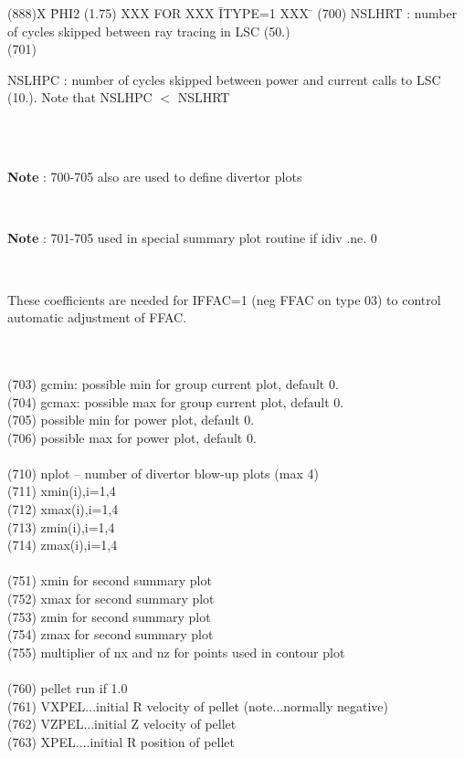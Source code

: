 \begin{tabbing}
(888)X \= PHI2 (1.75) XXX FOR XXX \= ITYPE=1 XXX \= \kill
(700) \> NSLHRT : number of cycles skipped between ray tracing in LSC (50.)\\
(701) \> \parbox[t]{\width}{NSLHPC : number of cycles skipped between power and current calls to LSC
(10.). Note that NSLHPC $<$ NSLHRT}\\
 \\
\parbox[t]{\textwidth}{{\bf Note} : 700-705 also are used to define divertor plots} \\
\parbox[t]{\textwidth}{{\bf Note} : 701-705 used in special summary plot routine if idiv .ne. 0} \\
\parbox[t]{\textwidth}{These coefficients are needed for IFFAC=1 (neg FFAC on type 03) to
control automatic adjustment of FFAC.}\\
  \\  
(703) \> gcmin: possible min for group current plot, default 0. \\
(704) \> gcmax: possible max for group current plot, default 0. \\
(705) \> possible min for power plot, default 0. \\
(706) \> possible max for power plot, default 0. \\
  \\  
(710) \> nplot -- number of divertor blow-up plots (max 4) \\
(711) \> xmin(i),i=1,4 \\
(712) \> xmax(i),i=1,4 \\
(713) \> zmin(i),i=1,4 \\
(714) \> zmax(i),i=1,4 \\
  \\  
(751) \> xmin for second summary plot \\
(752) \> xmax for second summary plot \\
(753) \> zmin for second summary plot \\
(754) \> zmax for second summary plot \\
(755) \> multiplier of nx and nz for points used in contour plot \\
  \\  
(760) \> pellet run if 1.0 \\
(761) \> VXPEL...initial R velocity of pellet (note...normally negative) \\
(762) \> VZPEL...initial Z velocity of pellet \\
(763) \> XPEL....initial R position of pellet \\

\end{tabbing}
